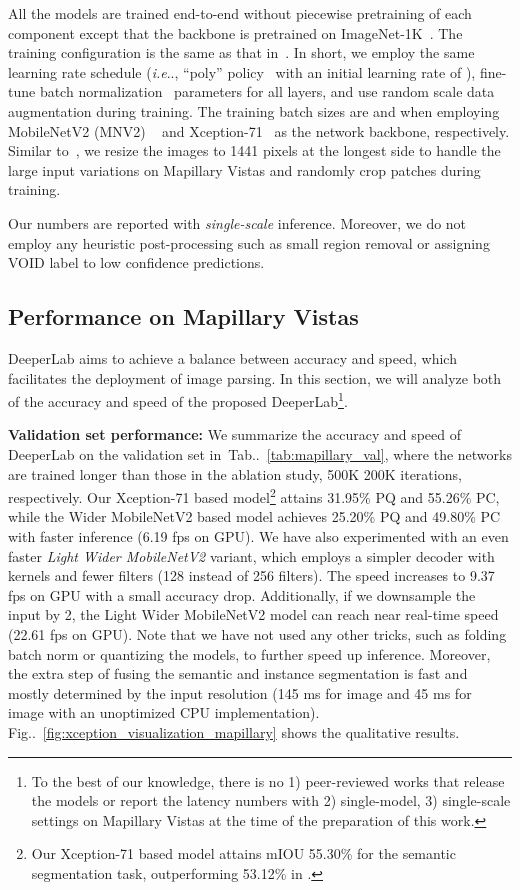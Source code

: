 \documentclass[10pt,twocolumn,letterpaper]{article}
\makeatletter
\def\@onedot{\ifx\@let@token.\else.\null\fi\xspace}
\DeclareRobustCommand\onedot{\futurelet\@let@token\@onedot}
\newcommand{\figref}[1]{Fig\onedot~\ref{#1}}
\newcommand{\tabref}[1]{Tab\onedot~\ref{#1}}
\def\ie{\emph{i.e}\onedot} \def\Ie{\emph{I.e}\onedot}
\makeatother
\begin{document}
All the models are trained end-to-end without piecewise pretraining of each component except that the backbone is pretrained on ImageNet-1K~\cite{ILSVRC15}. The training configuration is the same as that in~\cite{chen2017rethinking}. In short, we employ the same learning rate schedule (\ie, ``poly'' policy~\cite{liu2015parsenet} with an initial learning rate of ), fine-tune batch normalization~\cite{ioffe2015batch} parameters for all layers, and use random scale data augmentation during training. The training batch sizes are  and  when employing MobileNetV2 (MNV2) ~\cite{mobilenetv22018} and Xception-71~\cite{chollet2016xception, dai2017coco, deeplabv3plus2018} as the network backbone, respectively. Similar to~\cite{zhao2017pyramid, neuhold2017mapillary}, we resize the images to 1441 pixels at the longest side to handle the large input variations on Mapillary Vistas and randomly crop  patches during training.

Our numbers are reported with \emph{single-scale} inference. Moreover, we do not employ any heuristic post-processing such as small region removal or assigning VOID label to low confidence predictions.

\subsection{Performance on Mapillary Vistas}

DeeperLab aims to achieve a balance between accuracy and speed, which facilitates the deployment of image parsing. In this section, we will analyze both of the accuracy and speed of the proposed DeeperLab\footnote{To the best of our knowledge, there is no 1) peer-reviewed works that release the models or report the latency numbers with 2) single-model, 3) single-scale settings on Mapillary Vistas at the time of the preparation of this work.}.

{\bf Validation set performance:} We summarize the accuracy and speed of DeeperLab on the validation set in~\tabref{tab:mapillary_val}, where the networks are trained longer than those in the ablation study, 500K \vs 200K iterations, respectively. Our Xception-71 based model\footnote{Our Xception-71 based model attains mIOU 55.30\% for the semantic segmentation task, outperforming 53.12\% in \cite{bulo2017place}.} attains 31.95\% PQ and 55.26\% PC, while the Wider MobileNetV2 based model achieves 25.20\% PQ and 49.80\% PC with faster inference (6.19  fps on GPU). We have also experimented with an even faster \emph{Light Wider MobileNetV2} variant, which employs a simpler decoder with  kernels and fewer filters (128 instead of 256 filters). The speed increases to 9.37 fps on GPU with a small accuracy drop. Additionally, if we downsample the input by 2, the Light Wider MobileNetV2 model can reach near real-time speed (22.61 fps on GPU). Note that we have not used any other tricks, such as folding batch norm or quantizing the models, to further speed up inference. Moreover, the extra step of fusing the semantic and instance segmentation is fast and mostly determined by the input resolution (145 ms for  image and 45 ms for  image with an unoptimized CPU implementation). \figref{fig:xception_visualization_mapillary} shows the qualitative results.
\end{document}
